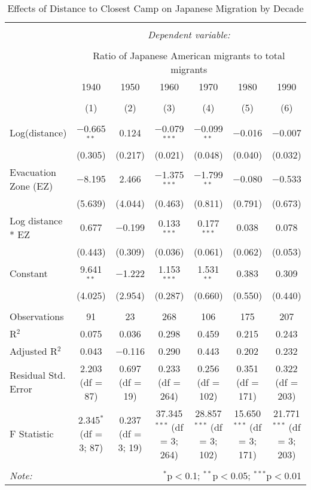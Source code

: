 
\begin{table}[!htbp] \centering 
  \caption{Effects of Distance to Closest Camp on Japanese Migration by Decade} 
  \label{ezdistreg} 
\begin{tabular}{@{\extracolsep{2pt}}lcccccc} 
\\[-1.8ex]\hline 
\hline \\[-1.8ex] 
 & \multicolumn{6}{c}{\textit{Dependent variable:}} \\ 
\cline{2-7} 
\\[-1.8ex] & \multicolumn{6}{c}{Ratio of Japanese American migrants to total migrants} \\ 
 & 1940 & 1950 & 1960 & 1970 & 1980 & 1990 \\ 
\\[-1.8ex] & (1) & (2) & (3) & (4) & (5) & (6)\\ 
\hline \\[-1.8ex] 
 Log(distance) & $-$0.665$^{**}$ & 0.124 & $-$0.079$^{***}$ & $-$0.099$^{**}$ & $-$0.016 & $-$0.007 \\ 
  & (0.305) & (0.217) & (0.021) & (0.048) & (0.040) & (0.032) \\ 
  Evacuation Zone (EZ) & $-$8.195 & 2.466 & $-$1.375$^{***}$ & $-$1.799$^{**}$ & $-$0.080 & $-$0.533 \\ 
  & (5.639) & (4.044) & (0.463) & (0.811) & (0.791) & (0.673) \\ 
  Log distance * EZ  & 0.677 & $-$0.199 & 0.133$^{***}$ & 0.177$^{***}$ & 0.038 & 0.078 \\ 
  & (0.443) & (0.309) & (0.036) & (0.061) & (0.062) & (0.053) \\ 
  Constant & 9.641$^{**}$ & $-$1.222 & 1.153$^{***}$ & 1.531$^{**}$ & 0.383 & 0.309 \\ 
  & (4.025) & (2.954) & (0.287) & (0.660) & (0.550) & (0.440) \\ 
 \hline \\[-1.8ex] 
Observations & 91 & 23 & 268 & 106 & 175 & 207 \\ 
R$^{2}$ & 0.075 & 0.036 & 0.298 & 0.459 & 0.215 & 0.243 \\ 
Adjusted R$^{2}$ & 0.043 & $-$0.116 & 0.290 & 0.443 & 0.202 & 0.232 \\ 
Residual Std. Error & 2.203 (df = 87) & 0.697 (df = 19) & 0.233 (df = 264) & 0.256 (df = 102) & 0.351 (df = 171) & 0.322 (df = 203) \\ 
F Statistic & 2.345$^{*}$ (df = 3; 87) & 0.237 (df = 3; 19) & 37.345$^{***}$ (df = 3; 264) & 28.857$^{***}$ (df = 3; 102) & 15.650$^{***}$ (df = 3; 171) & 21.771$^{***}$ (df = 3; 203) \\ 
\hline 
\hline \\[-1.8ex] 
\textit{Note:}  


& \multicolumn{6}{r}{$^{*}$p$<$0.1; $^{**}$p$<$0.05; $^{***}$p$<$0.01} \\ 
\end{tabular} 
\end{table} 
